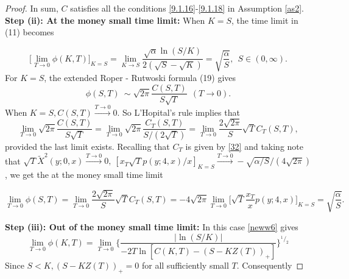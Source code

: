 \documentclass[a4 paper, 12pt]{report}
\newcommand*\rfrac[2]{{}^{#1}\!/_{#2}}
\theoremstyle{plain}
\begin{document}
\begin{proof}
\par In sum, $C$ satisfies all the conditions \eqref{9.1.16}-\eqref{9.1.18} in Assumption \ref{as2}.\\

\textbf{Step (ii): At the money small time limit:} When $K = S$, the time limit in (11) becomes

\begin{equation}\label{33}
\bigg[\lim_{T\rightarrow 0}\phi(K,T)\bigg]_{K = S} = \lim_{K\rightarrow S}\frac{\sqrt{\alpha}\ln(S/K)}{2(\sqrt{S} - \sqrt{K})} = \sqrt{\frac{\alpha}{S}}, ~~ S\in(0,\infty).
\end{equation}
For $K = S$, the extended Roper - Rutwoski formula (19) gives 
$$
\phi(S,T)~\sim\sqrt{2\pi}\frac{C(S,T)}{S\sqrt{T}}~~(T\rightarrow 0).
$$
When $K = S,C(S,T)\stackrel{T\rightarrow 0}{\longrightarrow}0$. So L'Hopital's rule implies that 
$$
\lim_{T\rightarrow 0}\sqrt{2\pi}\frac{C(S,T)}{S\sqrt{T}} = \lim_{T\rightarrow 0}\sqrt{2\pi}\frac{C_T(S,T)}{S/(2\sqrt{T})} = \lim_{T\rightarrow 0}\frac{2\sqrt{2\pi}}{S}\sqrt{T}C_T(S,T),
$$
provided the last limit exists. Recalling that $C_T$ is given by \eqref{32} and taking note that $\sqrt{T}\tilde{X}^2(y;0,x)\stackrel{T\rightarrow 0}{\longrightarrow}0,~[x_T\sqrt{T}p(y;4,x)/x]_{K = S}\stackrel{T\rightarrow 0}{\longrightarrow}-\sqrt{\alpha/S}/(4\sqrt{2\pi})$, we get the at the money small time limit

$$
\lim_{T\rightarrow 0}\phi(S,T) = \lim_{T\rightarrow 0}\frac{2\sqrt{2\pi}}{S}\sqrt{T}C_T(S,T) = -4\sqrt{2\pi}\lim_{T\rightarrow 0}\bigg[\sqrt{T}\frac{x_T}{x}p(y;4,x)\bigg]_{K = S} = \sqrt{\frac{\alpha}{S}}.
$$

\textbf{Step (iii): Out of the money small time limit:} In this case \eqref{neww6}  gives
$$
\lim_{T\rightarrow 0}\phi(K,T) = \lim_{T\rightarrow 0}\bigg\{\frac{|\ln(S/K)|}{-2T\ln[C(K,T) - (S-KZ(T))_+]}\bigg\}^{\rfrac{1}{2}}
$$
Since $S<K,(S-KZ(T))_+ = 0$ for all sufficiently small $T$. Consequently


\end{proof}
\end{document}
